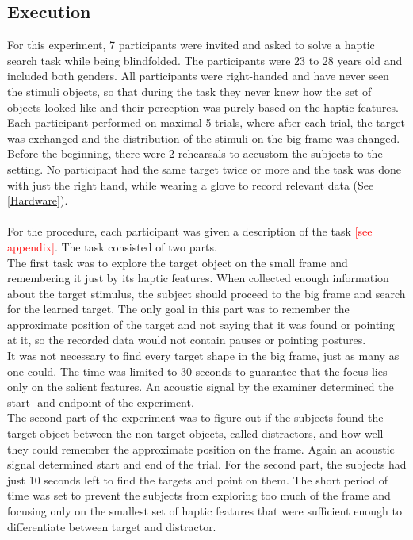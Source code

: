 \subsection{Execution}  
For this experiment, 7 participants were invited and asked to solve a haptic search task while being blindfolded. The participants were 23 to 28 years old and included both genders. All participants were right-handed and have never seen the stimuli objects, so that during the task they never knew how the set of objects looked like and their perception was purely based on the haptic features.\\
Each participant performed on maximal 5 trials, where after each trial, the target was exchanged and the distribution of the stimuli on the big frame was changed. Before the beginning, there were 2 rehearsals to accustom the subjects to the setting. No participant had the same target twice or more and the task was done with just the right hand, while wearing a glove to record relevant data (See \ref{Hardware}).\\
\\
For the procedure, each participant was given a description of the task \textcolor{red}{[see appendix]}. The task consisted of two parts. \\
The first task was to explore the target object on the small frame and remembering it just by its haptic features. When collected enough information about the target stimulus, the subject should proceed to the big frame and search for the learned target. The only goal in this part was to remember the approximate position of the target and not saying that it was found or pointing at it, so the recorded data would not contain pauses or pointing postures.\\
It was not necessary to find every target shape in the big frame, just as many as one could. The time was limited to 30 seconds to guarantee that the focus lies only on the salient features. An acoustic signal by the examiner determined the start- and endpoint of the experiment.\\
The second part of the experiment was to figure out if the subjects found the target object between the non-target objects, called distractors, and how well they could remember the approximate position on the frame. Again an acoustic signal determined start and end of the trial. For the second part, the subjects had just 10 seconds left to find the targets and point on them. The short period of time was set to prevent the subjects from exploring too much of the frame and focusing only on the smallest set of haptic features that were sufficient enough to differentiate between target and distractor.\\

